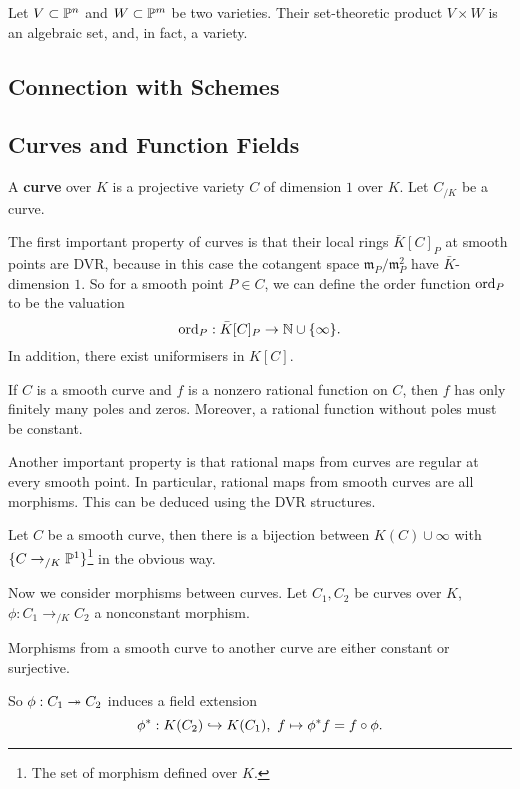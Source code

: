 Let $V\subset \P^n$ and $W\subset \P^m$ be two varieties.
Their set-theoretic product $V\times W$ is an algebraic set, and, in fact, a variety.

\subsection{Connection with Schemes}

\subsection{Curves and Function Fields}
A \textbf{curve} over $K$ is a projective variety $C$ of dimension $1$ over $K$. Let $C_{/K}$ be a curve.

The first important property of curves is that their local rings $\bar{K}[C]_P$ at smooth points are DVR, because in this case the cotangent space $\mathfrak{m}_P/\mathfrak{m}_P^2$ have $\bar{K}$-dimension $1$.
So for a smooth point $P\in C$, we can define the order function $\ord_P$ to be the valuation \[\ord_P : \bar{K}[C]_P \to\N\cup\{\infty\}.\]
In addition, there exist uniformisers in $K[C]$.

\begin{proposition}
    If $C$ is a smooth curve and $f$ is a nonzero rational function on $C$, then $f$ has only finitely many poles and zeros.
    Moreover, a rational function without poles must be constant.
\end{proposition}

Another important property is that rational maps from curves are regular at every smooth point. In particular, rational maps from smooth curves are all morphisms. This can be deduced using the DVR structures.
\begin{example}
    Let $C$ be a smooth curve, then there is a bijection between $K(C)\cup{\infty}$ with $\{C\to_{/K}\P^1\}$\footnote{The set of morphism defined over $K$.} in the obvious way.
\end{example}

Now we consider morphisms between curves. Let $C_1, C_2$ be curves over $K$, $\phi : C_1\to_{/K}C_2$ a nonconstant morphism.
\begin{theorem}
    Morphisms from a smooth curve to another curve are either constant or surjective.
\end{theorem}
So $\phi : C_1\surject C_2$ induces a field extension \[\phi^* : K(C_2)\inject K(C_1),\ f \mapsto \phi^*f = f\circ \phi.\]

